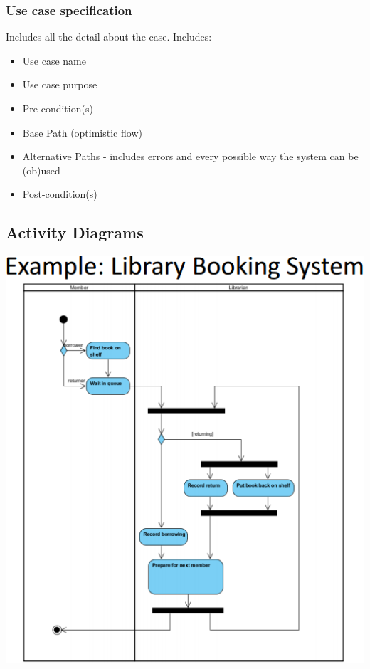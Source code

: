 \documentclass{article}
\begin{document}
\subsubsection{Use case specification}

Includes all the detail about the case. Includes:

\begin{itemize}
    \item Use case name
    \item Use case purpose
    \item Pre-condition(s)
    \item Base Path (optimistic flow)
    \item Alternative Paths  - includes errors and every possible way the system can be (ob)used
    \item Post-condition(s)
\end{itemize}

\subsection{Activity Diagrams}

\includegraphics[scale = 0.9]{activityDiagram.png}
\newpage
\end{document}
